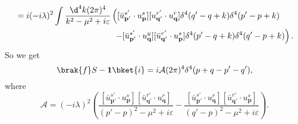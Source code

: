 \documentclass[a4paper]{article}
\begin{document}
\begin{eg}
\begin{align*}
    &= i(-i\lambda)^2 \int \frac{\d^4 k (2\pi)^4}{k^2 - \mu^2 + i \varepsilon}\left([\bar u_{\mathbf{p}'}^{s'} \cdot u_\mathbf{p}^s][u_{\mathbf{q}'}^{r'} \cdot u_{\mathbf{q}}^r] \delta^4(q' - q + k)\delta^4(p' - p + k)\right.\\
    &\hphantom{= i(-i\lambda)^2 \int \frac{\d^4 k (2\pi)^4}{k^2 - \mu^2 + i \varepsilon}\Big(}\left.- [\bar u_{\mathbf{p}'}^{s'} \cdot u_\mathbf{q}^y][\bar u_{\mathbf{q}'}^{r'} \cdot u_{\mathbf{p}}^s] \delta^4(p' - q + k)\delta^4(q' - p + k)\right).
  \end{align*}
  So we get
  \[
    \brak{f}S - \mathbf{1}\bket{i} = i \mathcal{A}(2\pi)^4 \delta^4(p + q - p' - q'),
  \]
  where
  \[
    \mathcal{A} = (-i \lambda)^2 \left( \frac{[\bar u_{\mathbf{p}'}^{s'} \cdot u_\mathbf{p}^s][\bar u_{\mathbf{q}'}^{r'} \cdot u_\mathbf{q}^r]}{(p' - p)^2 - \mu^2 + i \varepsilon} - \frac{[\bar u_{\mathbf{p}'}^{s'} \cdot u_\mathbf{q}^r][\bar u_{\mathbf{q}'}^{r'} \cdot u_\mathbf{p}^s]}{(q' - p)^2 - \mu^2 + i \varepsilon}\right).
  \]
\end{eg}
\end{document}

